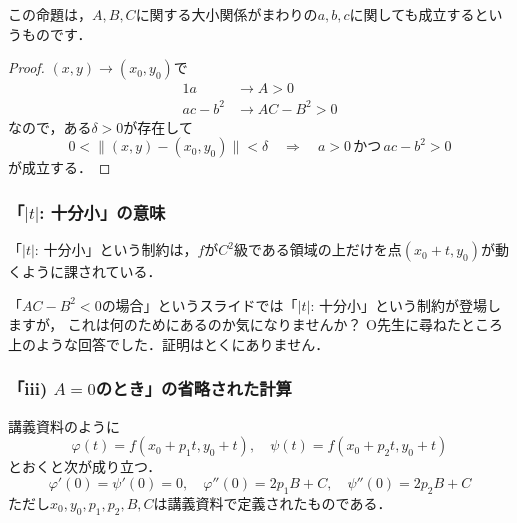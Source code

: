 \documentclass[./index]{subfiles}
\begin{document}
この命題は，$A, B, C$に関する大小関係がまわりの$a, b, c$に関しても成立するというものです．

\begin{proof}
    $(x, y) \rightarrow (x_0, y_0)$で
    \begin{alignat}{1}
        a &\rightarrow A > 0 \\
        ac - b^2 &\rightarrow AC - B^2 > 0
    \end{alignat}
    なので，ある$\delta > 0$が存在して
    \begin{equation}
        0 < \| (x, y) - (x_0, y_0) \| < \delta
        \quad \Longrightarrow \quad
        a > 0
        \,\mbox{かつ}\,
        ac - b^2 > 0
    \end{equation}
    が成立する．
\end{proof}

\subsubsection{「$|t|$: 十分小」の意味}
\begin{screen}
    \begin{proposition}
        「$|t|$: 十分小」という制約は，$f$が$C^2$級である領域の上だけを点$(x_0 + t, y_0)$が動くように課されている．
    \end{proposition}
\end{screen}

「$AC-B^2<0$の場合」というスライドでは「$|t|$: 十分小」という制約が登場しますが，
これは何のためにあるのか気になりませんか？
O先生に尋ねたところ上のような回答でした．証明はとくにありません．

\subsubsection{「iii) $A=0$のとき」の省略された計算}
\begin{screen}
    \begin{proposition}
        講義資料のように
        \begin{equation}
            \varphi(t) = f(x_0 + p_1 t, y_0 + t),
            \quad
            \psi(t)    = f(x_0 + p_2 t, y_0 + t)
        \end{equation}
        とおくと次が成り立つ．
        \begin{equation}
            \varphi'(0) = \psi'(0) = 0,
            \quad
            \varphi''(0) = 2p_1 B + C,
            \quad
            \psi''(0)    = 2p_2 B + C
        \end{equation}
        ただし$x_0, y_0, p_1, p_2, B, C$は講義資料で定義されたものである．
    \end{proposition}
\end{screen}
\end{document}
